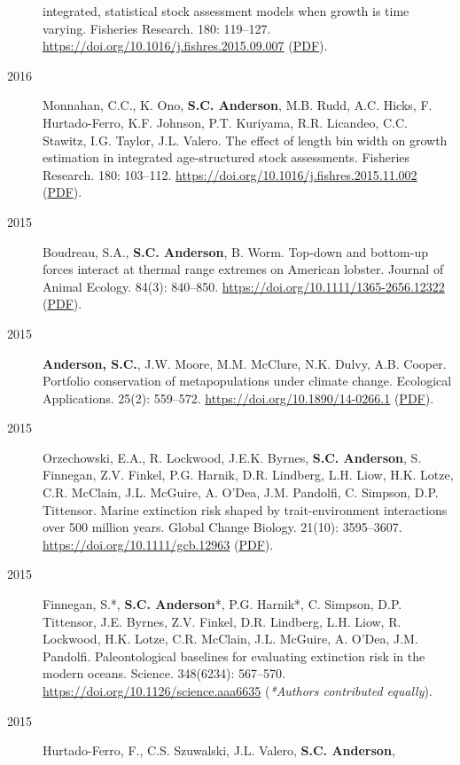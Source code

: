 \begin{description}
integrated, statistical stock assessment models when growth is time
varying. Fisheries Research. 180: 119--127.
\url{https://doi.org/10.1016/j.fishres.2015.09.007}
(\href{https://www.dropbox.com/s/425a18a4xm9kq8l/Kuriyama_etal_2016_empirical.pdf?dl=1}{PDF}).
\item[2016]
Monnahan, C.C., K. Ono, \textbf{S.C. Anderson}, M.B. Rudd, A.C. Hicks,
F. Hurtado-Ferro, K.F. Johnson, P.T. Kuriyama, R.R. Licandeo, C.C.
Stawitz, I.G. Taylor, J.L. Valero. The effect of length bin width on
growth estimation in integrated age-structured stock assessments.
Fisheries Research. 180: 103--112.
\url{https://doi.org/10.1016/j.fishres.2015.11.002}
(\href{https://www.dropbox.com/s/uksmdtptby9w0ku/Monnahan_etal_2016_binwidth.pdf?dl=1}{PDF}).
\item[2015]
Boudreau, S.A., \textbf{S.C. Anderson}, B. Worm. Top-down and bottom-up
forces interact at thermal range extremes on American lobster. Journal
of Animal Ecology. 84(3): 840--850.
\url{https://doi.org/10.1111/1365-2656.12322}
(\href{https://www.dropbox.com/s/w027swfx2o8hgvl/Boudreau_etal_2015_lobster.pdf?dl=1}{PDF}).
\item[2015]
\textbf{Anderson, S.C.}, J.W. Moore, M.M. McClure, N.K. Dulvy, A.B.
Cooper. Portfolio conservation of metapopulations under climate change.
Ecological Applications. 25(2): 559--572.
\url{https://doi.org/10.1890/14-0266.1}
(\href{https://www.dropbox.com/s/141rsnv5rc7mi5i/Anderson_etal_2015_salmonportfolios.pdf?dl=1}{PDF}).
\item[2015]
Orzechowski, E.A., R. Lockwood, J.E.K. Byrnes, \textbf{S.C. Anderson},
S. Finnegan, Z.V. Finkel, P.G. Harnik, D.R. Lindberg, L.H. Liow, H.K.
Lotze, C.R. McClain, J.L. McGuire, A. O'Dea, J.M. Pandolfi, C. Simpson,
D.P. Tittensor. Marine extinction risk shaped by trait-environment
interactions over 500 million years. Global Change Biology. 21(10):
3595--3607. \url{https://doi.org/10.1111/gcb.12963}
(\href{https://sean.updog.co/papers/Orzechowski_etal_2015_paleometa.pdf}{PDF}).
\item[2015]
Finnegan, S.*, \textbf{S.C. Anderson}*, P.G. Harnik*, C. Simpson, D.P.
Tittensor, J.E. Byrnes, Z.V. Finkel, D.R. Lindberg, L.H. Liow, R.
Lockwood, H.K. Lotze, C.R. McClain, J.L. McGuire, A. O'Dea, J.M.
Pandolfi. Paleontological baselines for evaluating extinction risk in
the modern oceans. Science. 348(6234): 567--570.
\url{https://doi.org/10.1126/science.aaa6635} (\emph{*Authors
contributed equally}).
\item[2015]
Hurtado-Ferro, F., C.S. Szuwalski, J.L. Valero, \textbf{S.C. Anderson},

\end{description}
